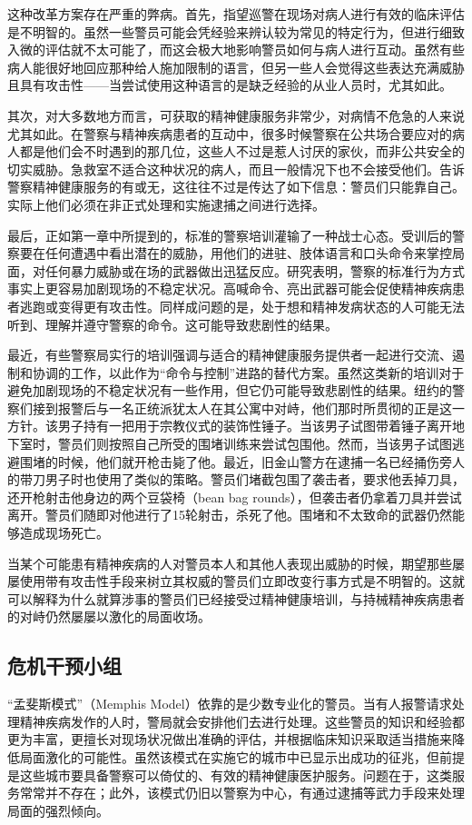 \documentclass[fontset=fandol, a4paper, 12pt, openright]{ctexbook}
\begin{document}
这种改革方案存在严重的弊病。首先，指望巡警在现场对病人进行有效的临床评估是不明智的。虽然一些警员可能会凭经验来辨认较为常见的特定行为，但进行细致入微的评估就不太可能了，而这会极大地影响警员如何与病人进行互动。虽然有些病人能很好地回应那种给人施加限制的语言，但另一些人会觉得这些表达充满威胁且具有攻击性——当尝试使用这种语言的是缺乏经验的从业人员时，尤其如此。

其次，对大多数地方而言，可获取的精神健康服务非常少，对病情不危急的人来说尤其如此。在警察与精神疾病患者的互动中，很多时候警察在公共场合要应对的病人都是他们会不时遇到的那几位，这些人不过是惹人讨厌的家伙，而非公共安全的切实威胁。急救室不适合这种状况的病人，而且一般情况下也不会接受他们。告诉警察精神健康服务的有或无，这往往不过是传达了如下信息：警员们只能靠自己。实际上他们必须在非正式处理和实施逮捕之间进行选择。

最后，正如第一章中所提到的，标准的警察培训灌输了一种战士心态。受训后的警察要在任何遭遇中看出潜在的威胁，用他们的进驻、肢体语言和口头命令来掌控局面，对任何暴力威胁或在场的武器做出迅猛反应。研究表明，警察的标准行为方式事实上更容易加剧现场的不稳定状况。高喊命令、亮出武器可能会促使精神疾病患者逃跑或变得更有攻击性。同样成问题的是，处于想和精神发病状态的人可能无法听到、理解并遵守警察的命令。这可能导致悲剧性的结果。

最近，有些警察局实行的培训强调与适合的精神健康服务提供者一起进行交流、遏制和协调的工作，以此作为“命令与控制”进路的替代方案。虽然这类新的培训对于避免加剧现场的不稳定状况有一些作用，但它仍可能导致悲剧性的结果。纽约的警察们接到报警后与一名正统派犹太人在其公寓中对峙，他们那时所贯彻的正是这一方针。该男子持有一把用于宗教仪式的装饰性锤子。当该男子试图带着锤子离开地下室时，警员们则按照自己所受的围堵训练来尝试包围他。然而，当该男子试图逃避围堵的时候，他们就开枪击毙了他。最近，旧金山警方在逮捕一名已经捅伤旁人的带刀男子时也使用了类似的策略。警员们堵截包围了袭击者，要求他丢掉刀具，还开枪射击他身边的两个豆袋椅（bean bag rounds），但袭击者仍拿着刀具并尝试离开。警员们随即对他进行了15轮射击，杀死了他。围堵和不太致命的武器仍然能够造成现场死亡。

当某个可能患有精神疾病的人对警员本人和其他人表现出威胁的时候，期望那些屡屡使用带有攻击性手段来树立其权威的警员们立即改变行事方式是不明智的。这就可以解释为什么就算涉事的警员们已经接受过精神健康培训，与持械精神疾病患者的对峙仍然屡屡以激化的局面收场。

\subsection{危机干预小组}
“孟斐斯模式”（Memphis Model）依靠的是少数专业化的警员。当有人报警请求处理精神疾病发作的人时，警局就会安排他们去进行处理。这些警员的知识和经验都更为丰富，更擅长对现场状况做出准确的评估，并根据临床知识采取适当措施来降低局面激化的可能性。虽然该模式在实施它的城市中已显示出成功的征兆，但前提是这些城市要具备警察可以倚仗的、有效的精神健康医护服务。问题在于，这类服务常常并不存在；此外，该模式仍旧以警察为中心，有通过逮捕等武力手段来处理局面的强烈倾向。
\end{document}
